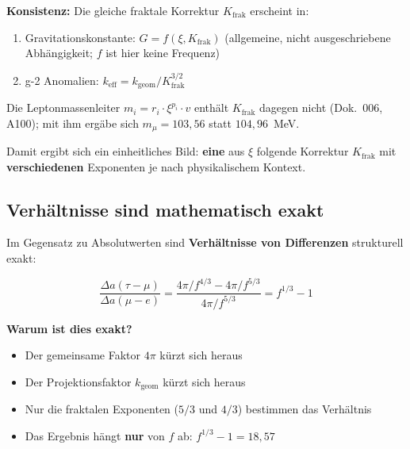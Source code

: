 	\textbf{Konsistenz:} Die gleiche fraktale Korrektur $K_\text{frak}$ erscheint in:
	\begin{enumerate}
		\item Gravitationskonstante: $G = f(\xi, K_\text{frak})$ (allgemeine, nicht ausgeschriebene Abhängigkeit; $f$ ist hier keine Frequenz)
		\item g-2 Anomalien: $k_\text{eff} = k_\text{geom} / K_\text{frak}^{3/2}$
	\end{enumerate}
	Die Leptonmassenleiter $m_i = r_i \cdot \xi^{p_i} \cdot v$ enthält $K_\text{frak}$ dagegen nicht (Dok.~006, A100); mit ihm ergäbe sich $m_\mu = 103{,}56$ statt $104{,}96$~MeV.
	
	Damit ergibt sich ein einheitliches Bild: \textbf{eine} aus $\xi$ folgende Korrektur $K_\text{frak}$ mit \textbf{verschiedenen} Exponenten je nach physikalischem Kontext.
	
	\subsection{Verhältnisse sind mathematisch exakt}
	
	Im Gegensatz zu Absolutwerten sind \textbf{Verhältnisse von Differenzen} strukturell exakt:
	
	\begin{equation}
		\frac{\Delta a(\tau - \mu)}{\Delta a(\mu - e)} = \frac{4\pi/f^{4/3} - 4\pi/f^{5/3}}{4\pi/f^{5/3}} = f^{1/3} - 1
	\end{equation}
	
	\textbf{Warum ist dies exakt?}
	
	\begin{itemize}
		\item Der gemeinsame Faktor $4\pi$ kürzt sich heraus
		\item Der Projektionsfaktor $k_{\text{geom}}$ kürzt sich heraus
		\item Nur die fraktalen Exponenten ($5/3$ und $4/3$) bestimmen das Verhältnis
		\item Das Ergebnis hängt \textbf{nur} von $f$ ab: $f^{1/3} - 1 = 18{,}57$
	\end{itemize}
	
